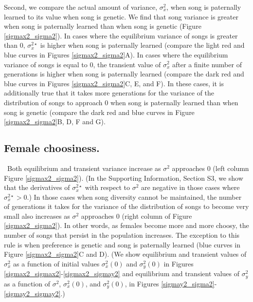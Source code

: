 \documentclass[12pt]{article}
\begin{document}
Second, we compare the actual amount of variance, $\sigma_x^2$, when song is paternally learned to its value when song is genetic. We find that song variance is greater when song is paternally learned than when song is genetic (Figure \ref{sigmax2_sigma2}). In cases where the equilibrium variance of songs is greater than $0$, $\sigma_x^{2\star}$ is higher when song is paternally learned (compare the light red and blue curves in Figures \ref{sigmax2_sigma2}A). In cases where the equilibrium variance of songs is equal to $0$, the transient value of $\sigma_x^2$ after a finite number of generations is higher when song is paternally learned (compare the dark red and blue curves in Figures \ref{sigmax2_sigma2}C, E, and F). In these cases, it is additionally true that it takes more generations for the variance of the distribution of songs to approach $0$ when song is paternally learned than when song is genetic (compare the dark red and blue curves in Figure \ref{sigmax2_sigma2}B, D, F and G). 
 

\subsection*{Female choosiness. }
\ Both equilibrium and transient variance increase as $\sigma^2$ approaches $0$ (left column Figure \ref{sigmax2_sigma2}). (In the Supporting Information, Section S3, we show that the derivatives of $\sigma_x^{2\star}$ with respect to $\sigma^2$ are negative in those cases where $\sigma_x^{2\star}>0$.) In those cases when song diversity cannot be maintained, the number of generations it takes for the variance of the distribution of songs to become very small also increases as $\sigma^2$ approaches $0$ (right column of Figure \ref{sigmax2_sigma2}). In other words, as females become more and more choosy, the number of songs that persist in the population increases.  The exception to this rule is when preference is genetic and song is paternally learned (blue curves in Figure \ref{sigmax2_sigma2}C and D).  (We show equilibrium and transient values of $\sigma_x^{2}$  as a function of initial values $\sigma_x^2(0)$ and $\sigma_y^2(0)$ in Figures \ref{sigmax2_sigmax2}-\ref{sigmax2_sigmay2} and equilibrium and transient values of $\sigma_y^{2}$ as a function of $\sigma^2$, $\sigma_x^2(0)$, and $\sigma_y^2(0)$, in Figures \ref{sigmay2_sigma2}-\ref{sigmay2_sigmay2}.)
 
\end{document}
